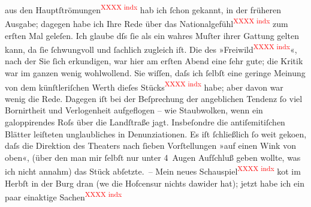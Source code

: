{\begin{ledgroupsized}[t]{13cm}
                  \label{K_L00787_1v}\label{K_L00787_1h} aus den Hauptſtrömungen\textcolor{red}{\textsuperscript{XXXX indx}} hab ich ſchon gekannt, in der
               früheren {\pb}Ausgabe; dagegen habe ich Ihre Rede über das Nationalgefühl\textcolor{red}{\textsuperscript{XXXX indx}} zum
               erſten Mal geleſen. Ich glaube dſs ſie als ein wahres Muſter ihrer Gattung gelten
               kann, da ſie ſchwungvoll und ſachlich zugleich iſt.\pend
           \pstart
           Die \label{K_L00787_2v}\label{K_L00787_2h} des »Freiwild\textcolor{red}{\textsuperscript{XXXX indx}}«,
               nach der Sie ſich erkundigen, war hier am erſten Abend eine ſehr gute; die Kritik war
               im ganzen wenig wohlwollend. Sie wiſſen, daſs ich ſelbſt {\pb}eine geringe Meinung von dem künſtleriſchen Werth
               dieſes Stücks\textcolor{red}{\textsuperscript{XXXX indx}} habe; aber davon
               war wenig die Rede. Dagegen  iſt bei der
               Beſprechung der angeblichen Tendenz ſo viel Bornirtheit und Verlogenheit aufgeflogen
               – wie Staubwolken, wenn ein galoppirendes Roſs über die Landſtraße jagt. Insbeſondre
               die antiſemitiſchen Blätter leiſteten unglaubliches in Denunziationen. Es iſt
               ſchließlich ſo weit geko{\geminationm}en, daſs die Direktion {\pb}des Theaters nach ſieben Vorſtellungen »auf einen Wink von oben«, (über den man
               mir ſelbſt nur unter 4 Augen Aufſchluß geben wollte, was ich nicht annahm) das Stück
               abſetzte. –\pend
           \pstart
           Mein neues Schauspiel\textcolor{red}{\textsuperscript{XXXX indx}} ko{\geminationm}t im Herbſt in der Burg
               dran (we{\geminationn} die Hofcensur nichts dawider hat); jetzt habe
               ich ein paar einaktige Sachen\textcolor{red}{\textsuperscript{XXXX indx}}

\end{ledgroupsized}}
